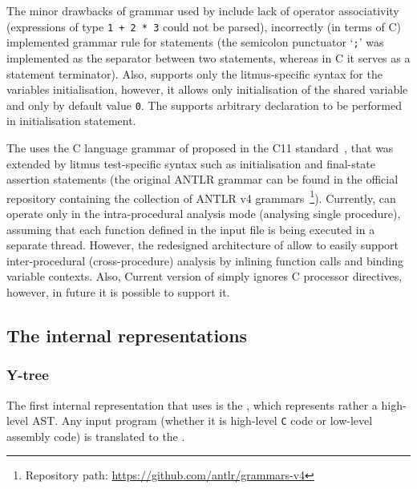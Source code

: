 The minor drawbacks of grammar used by \porthos[1] include lack of operator associativity (expressions of type \lstinline{1 + 2 * 3} could not be parsed), incorrectly (in terms of C) implemented grammar rule for statements (the semicolon punctuator `\lstinline{;}' was implemented as the separator between two statements, whereas in C it serves as a statement terminator). Also, \porthos[1] supports only the litmus-specific syntax for the variables initialisation, however, it allows only initialisation of the shared variable and only by default value \lstinline{0}. The \porthos[2] supports arbitrary declaration to be performed in initialisation statement.


The \porthos[2] uses the C language grammar of proposed in the C11 standard~\cite{jtc2011sc22}, that was extended by litmus test-specific syntax such as initialisation and final-state assertion statements (the original ANTLR grammar can be found in the official repository containing the collection of ANTLR v4 grammars~\footnote{Repository path: \url{https://github.com/antlr/grammars-v4}}).
Currently, \porthos[2] can operate only in the intra-procedural analysis mode (analysing single procedure), assuming that each function defined in the input file is being executed in a separate thread.
However, the redesigned architecture of \porthos[2] allow to easily support inter-procedural (cross-procedure) analysis by inlining function calls and binding variable contexts. Also, Current version of \porthos[2] simply ignores C processor directives, however, in future it is possible to support it.




\subsection{The internal representations}
\label{ch:impl:model}


\subsubsection{Y-tree}
\label{ch:impl:model:ytree}

The first internal representation that \porthos[2] uses is the \ytree, which represents rather a high-level AST. Any input program (whether it is high-level \texttt{C} code or low-level assembly code) is translated to the \ytree. 

